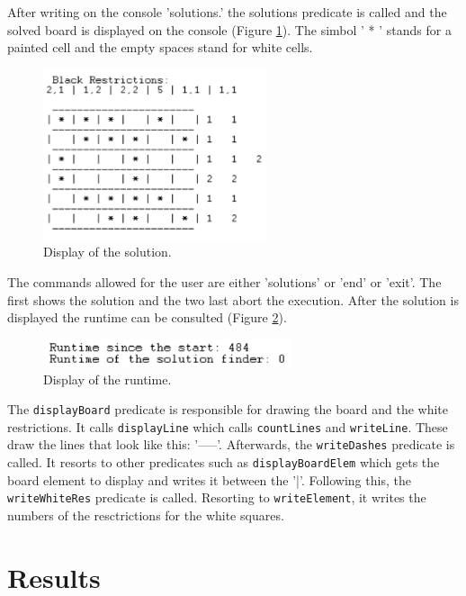 \documentclass[runningheads,a4paper]{llncs}
\begin{document}
	After writing on the console 'solutions.' the solutions predicate is called and the solved board is displayed on the console (Figure \ref{displayFinal}). The simbol ' * ' stands for a painted cell and the empty spaces stand for white cells.

	\begin{figure}[h]
	\centering
	\includegraphics[height=5cm]{displayFinal.png}
	\caption{Display of the solution.}
	\label{displayFinal}
	\end{figure}

	The commands allowed for the user are either 'solutions' or 'end' or 'exit'. The first shows the solution and the two last abort the execution.
	After the solution is displayed the runtime can be consulted (Figure \ref{runtime}).

	\begin{figure}[h]
	\centering
	\includegraphics[height=0.8cm]{runtime.png}
	\caption{Display of the runtime.}
	\label{runtime}
	\end{figure}

	The \verb|displayBoard| predicate is responsible for drawing the board and the white restrictions. It calls \verb|displayLine| which calls \verb|countLines| and \verb|writeLine|. These draw the lines that look like this: '-----'. Afterwards, the \verb|writeDashes| predicate is called. It resorts to other predicates such as \verb|displayBoardElem| which gets the board element to display and writes it between the '|'. Following this, the \verb|writeWhiteRes| predicate is called. Resorting to \verb|writeElement|, it writes the numbers of the resctrictions for the white squares.


\newpage
\section{Results}
\end{document}
